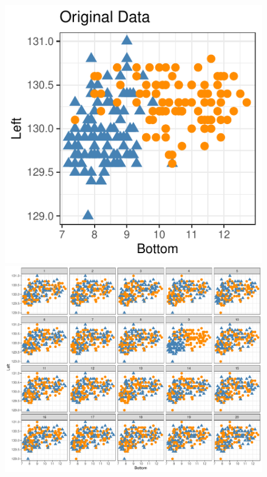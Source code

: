 \documentclass[letterpaper]{ar-1col}\usepackage[]{graphicx}\usepackage[]{color}
\newenvironment{knitrout}{}{} %
\begin{document}
\begin{figure}
\begin{minipage}{.3\textwidth}
\begin{knitrout}
\includegraphics[width=\textwidth]{figure/lineup-setup2-1} 

\end{knitrout}
\end{minipage}
\begin{minipage}[c]{.69\textwidth}
\begin{knitrout}
\color{fgcolor}
\includegraphics[width=\textwidth]{figure/lineup-creation2-1} 


\end{knitrout}
\end{minipage}
\end{figure}
\end{document}

